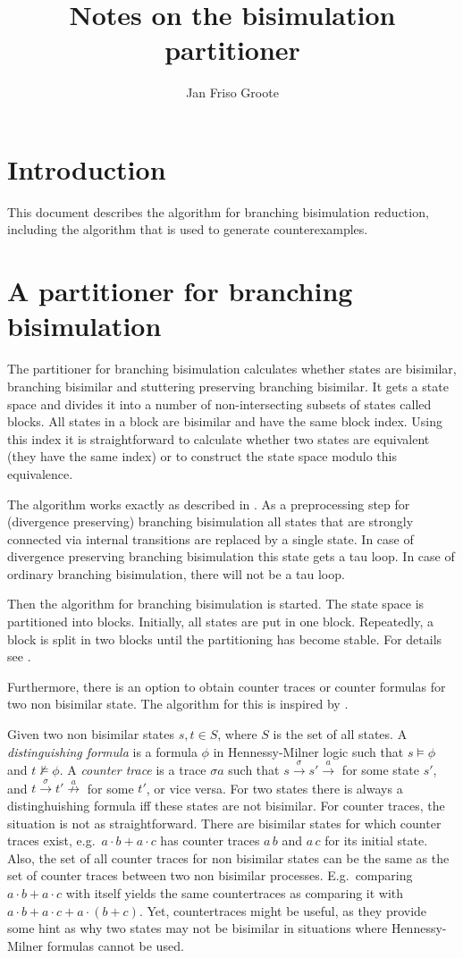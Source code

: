 \documentclass{article}
\title{Notes on the bisimulation partitioner}
\author{Jan Friso Groote}
\newcommand{\pijl}[1]{\stackrel{#1}{\longrightarrow}}
\newcommand{\notpijl}[1]{\stackrel{#1}{\not\longrightarrow}}
\begin{document}
\section{Introduction}
This document describes the algorithm for branching bisimulation reduction,
including the algorithm that is used to generate counterexamples.

\section{A partitioner for branching bisimulation}
The partitioner for branching bisimulation calculates 
whether states are bisimilar, branching bisimilar and stuttering
preserving branching bisimilar. It gets a state space and divides it into
a number of non-intersecting subsets of states called blocks. All
states in a block are bisimilar and have the same block index. 
Using this index it is straightforward to calculate whether two
states are equivalent (they have the same index) or to construct
the state space modulo this equivalence.

The algorithm works exactly as described in \cite{GV90}. As a preprocessing
step for (divergence
preserving) branching bisimulation all states that are strongly connected
via internal transitions are replaced by a single state. In case of divergence
preserving branching bisimulation this state gets a tau loop. In case of ordinary
branching bisimulation, there will not be a tau loop.

Then the algorithm for branching bisimulation is started. The state space is
partitioned into blocks. Initially, all states are put in one block. Repeatedly,
a block is split in two blocks until the partitioning has become stable. For
details see \cite{GV90}.

Furthermore, there is an option to obtain counter traces or counter formulas
for two non bisimilar state. The algorithm for this is inspired by \cite{C90,K91}.

Given two non bisimilar states $s,t\in S$, where $S$ is the set of all states. A
{\it distinguishing formula} is a formula $\phi$ in Hennessy-Milner logic such that
$s\models\phi$ and $t\not\models\phi$. A {\it counter trace} is a trace $\sigma a$ such
that $s\pijl{\sigma}s'\pijl{a}$ for some state $s'$, and $t\pijl{\sigma}t'\notpijl{a}$ for
some $t'$, or vice versa. For two states there is always a distinghuishing formula iff these states
are not bisimilar. For counter traces, the situation is not as straightforward.
There are bisimilar states for which counter traces exist, e.g.\ $a{\cdot}b+a{\cdot}c$
has counter traces $a\,b$ and $a\,c$ for its initial state. Also, the set of all counter
traces for non bisimilar states can be the same as the set of counter traces between
two non bisimilar processes. E.g.\ comparing $a{\cdot}b+a{\cdot}c$ with itself yields
the same countertraces as comparing it with $a{\cdot}b+a{\cdot}c+a{\cdot}(b+c)$. Yet,
countertraces might be useful, as they provide some hint as why two states may not
be bisimilar in situations where Hennessy-Milner formulas cannot be used.
\end{document}
